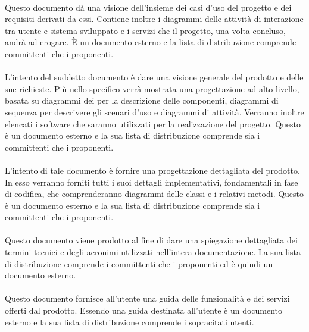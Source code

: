 \paragraph{\AdR}
Questo documento dà una visione dell'insieme dei casi d'uso del progetto e dei requisiti derivati da essi. Contiene inoltre i diagrammi delle attività di interazione tra utente e sistema sviluppato e i servizi che il progetto, una volta concluso, andrà ad erogare. È un documento esterno e la lista di distribuzione comprende committenti che i proponenti.

\paragraph{\SdF}
L'intento del suddetto documento è dare una visione generale del prodotto e delle sue richieste. Più nello specifico verrà mostrata una progettazione ad alto livello, basata su diagrammi dei  per la descrizione delle componenti, diagrammi di sequenza per descrivere gli scenari d'uso e diagrammi di attività. Verranno inoltre elencati i software che saranno utilizzati per la realizzazione del progetto. Questo è un documento esterno e la sua lista di distribuzione comprende  sia i committenti che i proponenti.

\paragraph{\DDP}
L'intento di tale documento è fornire una progettazione dettagliata del
prodotto. In esso verranno forniti tutti i suoi dettagli implementativi, fondamentali in fase di codifica, che comprenderanno diagrammi  delle classi e i relativi metodi. Questo è un documento esterno e la sua lista di distribuzione comprende  sia i committenti che i proponenti.

\paragraph{\Gl}
Questo documento viene prodotto al fine di dare una spiegazione dettagliata dei termini tecnici e degli acronimi utilizzati nell'intera documentazione. La sua lista di distribuzione comprende i committenti che i proponenti ed è quindi un documento esterno.

\paragraph{\MU}
Questo documento fornisce all'utente una guida delle funzionalità e dei servizi offerti dal prodotto. Essendo una guida destinata all'utente è un documento esterno e la sua lista di distribuzione comprende i sopracitati utenti. \\

